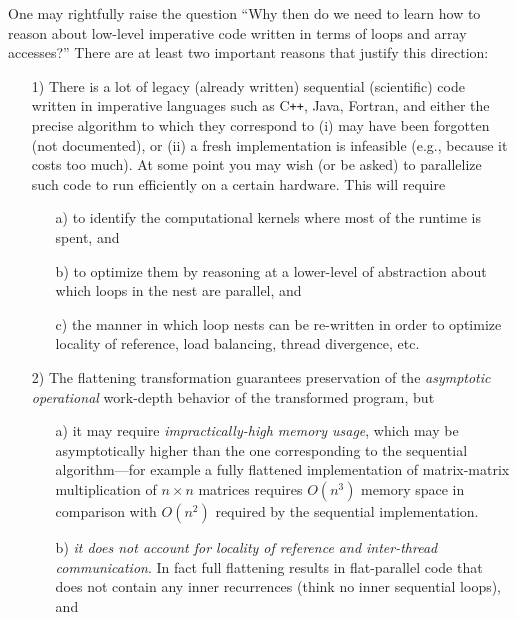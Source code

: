 \documentclass[acmsmall,review]{acmart}\settopmatter{printfolios=true,printccs=false,printacmref=false}
\begin{document}
One may rightfully raise the question ``Why then do we need to 
learn how to reason about low-level imperative code written in 
terms of loops and array accesses?'' There are at least two 
important reasons that justify this direction:
\begin{itemize}
    \item[1)] There is a lot of legacy (already written) sequential
        (scientific) code written in imperative languages such as
        C{\tt++}, Java, Fortran, and either the precise algorithm 
        to which they correspond to (i) may have been forgotten (not documented),
        or (ii) a fresh implementation is infeasible (e.g., because it
        costs too much).
        At some point you may wish (or be asked) to parallelize such
        code to run efficiently on a certain hardware. This will require
        \begin{itemize}
            \item[a)] to identify the computational kernels where most 
                of the runtime is spent, and 
            \item[b)] to optimize them by reasoning at a lower-level of 
                abstraction about which loops in the nest are parallel, and
            \item[c)] the manner in which loop nests can be re-written 
                in order to optimize locality of reference, load balancing, 
                thread divergence, etc. 
        \end{itemize}
    \item[2)] The flattening transformation guarantees preservation of 
        the \emph{asymptotic operational} work-depth behavior of the 
        transformed program, but 
        \begin{itemize}
            \item[a)] it may require {\em impractically-high memory usage},
                which may be asymptotically higher than the one corresponding 
                to the sequential algorithm---for example a fully flattened 
                implementation of matrix-matrix multiplication of $n\times n$ 
                matrices requires $O(n^3)$ memory space in comparison with 
                $O(n^2)$ required by the sequential implementation.
            \item[b)] \emph{it does not account for locality of reference
                and inter-thread communication}. In fact full flattening
                results in flat-parallel code that does not contain any
                inner recurrences (think no inner sequential loops), and

\end{itemize}
\end{itemize}
\end{document}
